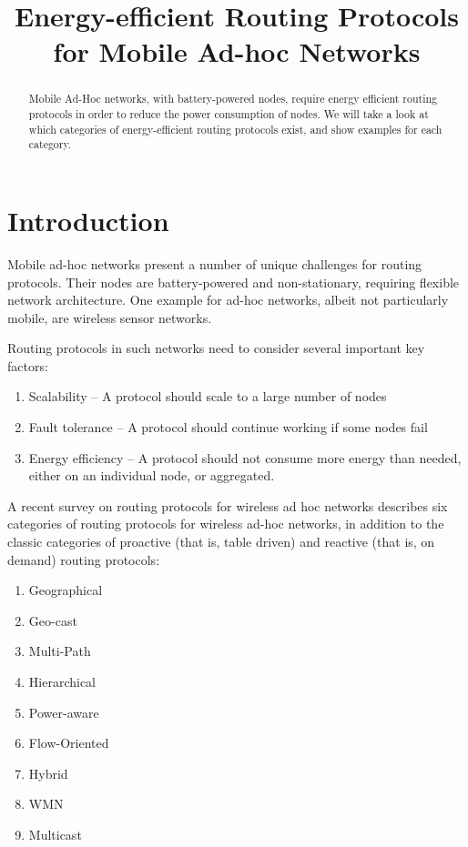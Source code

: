 \documentclass[conference]{IEEEtran}
\begin{document}
\title{Energy-efficient Routing Protocols for Mobile Ad-hoc Networks}
\author{
}

\maketitle



\begin{abstract}
Mobile Ad-Hoc networks, with battery-powered nodes, require energy efficient
routing protocols in order to reduce the power consumption of nodes. We will
take a look at which categories of energy-efficient routing protocols exist,
and show examples for each category.
\end{abstract}


\section{Introduction}
Mobile ad-hoc networks present a number of unique challenges for routing protocols.
Their nodes are battery-powered and non-stationary, requiring flexible network architecture.
One example for ad-hoc networks, albeit not particularly mobile, are wireless sensor networks.

Routing protocols in such networks need to consider several important key
factors:
\begin{enumerate}
   \item Scalability -- A protocol should scale to a large number of nodes
   \item Fault tolerance -- A protocol should continue working if some nodes fail
   \item Energy efficiency -- A protocol should not consume more energy than needed,
   either on an individual node, or aggregated.
\end{enumerate}

A recent survey\cite{alotaibi2012survey} on routing protocols for wireless
ad hoc networks describes six categories of routing protocols for wireless
ad-hoc networks,  in addition to the classic categories of proactive (that is, table driven)
and reactive (that is, on demand) routing protocols:
\begin{enumerate}
  \item Geographical
  \item Geo-cast
  \item Multi-Path
  \item Hierarchical
  \item Power-aware
  \item Flow-Oriented
  \item Hybrid
  \item WMN
  \item Multicast
\end{enumerate}
\end{document}

